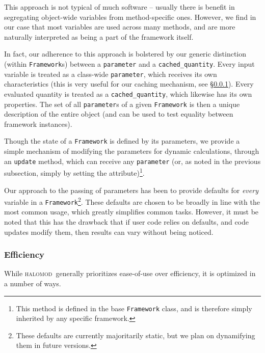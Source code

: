 \documentclass[5p]{elsarticle}
\newcommand{\halomod}{\textsc{halomod}}
\newcommand{\bd}[1]{\textcolor{purple}{\textbf{[BD: #1]}}}
\begin{document}
This approach is not typical of much software -- usually there is benefit in segregating object-wide variables from method-specific ones. However, we find in our case that most variables are used across many methods, and are more naturally interpreted as being a part of the framework itself. 

In fact, our adherence to this approach is bolstered by our generic distinction (within \verb|Framework|s) between a \verb|parameter| and a \verb|cached_quantity|. Every input variable is treated as a class-wide \verb|parameter|, which receives its own characteristics (this is very useful for our caching mechanism, see \S\ref{sec:halomod:overview:efficiency}). Every evaluated quantity is treated as a \verb|cached_quantity|, which likewise has its own properties. The set of all \verb|parameter|s of a given \verb|Framework| is then a unique description of the entire object (and can be used to test equality between framework instances). 

Though the state of a \verb|Framework| is defined by its parameters, we provide a simple mechanism of modifying the parameters for dynamic calculations, through an \verb|update| method, which can receive any \verb|parameter| (or, as noted in the previous subsection, simply by setting the attribute)\footnote{This method is defined in the base \texttt{Framework} class, and is therefore simply inherited by any specific framework.}.

Our approach to the passing of parameters has been to provide defaults for \textit{every} variable in a \verb|Framework|\footnote{These defaults are currently majoritarily static, but we plan on dynamifying them in future versions.}. These defaults are chosen to be broadly in line with the most common usage, which greatly simplifies common tasks. However, it must be noted that this has the drawback that if user code relies on defaults, and code updates modify them, then results can vary without being noticed. 



\subsubsection{Efficiency}
\label{sec:halomod:overview:efficiency}

While \halomod\ generally prioritizes ease-of-use over efficiency, it is optimized in a number of ways.
\end{document}
